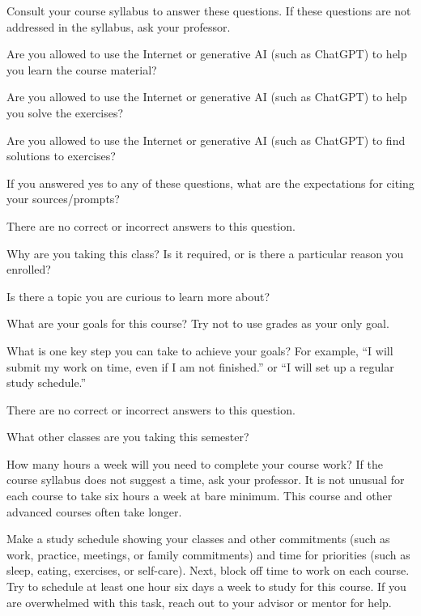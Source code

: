 \begin{exer} [\exerP]%
\label{exer_honesty}
    Consult your course syllabus to answer these questions.  If these questions are not addressed in the syllabus, ask your professor.    
    \begin{exerpart}
        \item Are you allowed to use the Internet or generative AI (such as ChatGPT) to help you learn the course material?
        \item Are you allowed to use the Internet or generative AI (such as ChatGPT) to help you solve the exercises?  
        \item Are you allowed to use the Internet or generative AI (such as ChatGPT) to find solutions to exercises?
        \item If you answered yes to any of these questions, what are the expectations for citing your sources/prompts?
    \end{exerpart}
\end{exer}

\begin{exer} [\exerU]%
\label{exer_motivation}
    There are no correct or incorrect answers to this question.    
    \begin{exerpart}
        \item Why are you taking this class?  Is it required, or is there a particular reason you enrolled?
        \item Is there a topic you are curious to learn more about?
        \item What are your goals for this course? Try not to use grades as your only goal.  
        \item What is one key step you can take to achieve your goals?  For example, ``I will submit my work on time, even if I am not finished.'' or ``I will set up a regular study schedule.''
    \end{exerpart}
\end{exer}

\begin{exer} [\exerU]%
\label{exer_time}
    There are no correct or incorrect answers to this question.    
    \begin{exerpart}
        \item What other classes are you taking this semester?  
        \item How many hours a week will you need to complete your course work?  If the course syllabus does not suggest a time, ask your professor.  It is not unusual for each course to take six hours a week at bare minimum.  This course and other advanced courses often take longer.
        \item Make a study schedule showing your classes and other commitments (such as work, practice, meetings, or family commitments) and time for priorities (such as sleep, eating, exercises, or self-care).  Next, block off time to work on each course.  Try to schedule at least one hour six days a week to study for this course.  If you are overwhelmed with this task, reach out to your advisor or mentor for help.
    \end{exerpart}
\end{exer}

